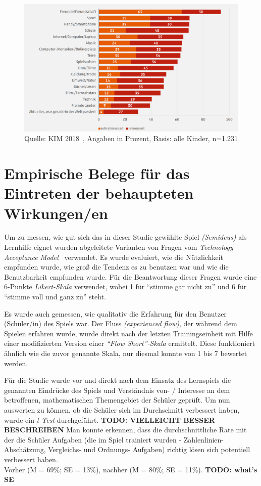 \documentclass[11pt, a4paper]{article}
\begin{document}
\begin{figure}[p]
    \centering
    \includegraphics[width=\textwidth]{img/kimstudie.png}
    \caption{Quelle: KIM 2018~\cite{feierabend2018kim}, Angaben in Prozent, Basis: alle Kinder, n=1.231}
    \label{fig:kim_studie}
\end{figure}

\newpage

\section*{Empirische Belege für das Eintreten der behaupteten Wirkungen/en}

Um zu messen, wie gut sich das in dieser Studie gewählte Spiel \textit{(Semideus)} als Lernhilfe eignet wurden abgeleitete Varianten von Fragen vom \textit{Technology Acceptance Model}~\cite{acceptance_of_Information_Technology_1989} verwendet. Es wurde evaluiert, wie die Nützlichkeit empfunden wurde, wie groß die Tendenz es zu benutzen war und wie die Benutzbarkeit empfunden wurde. Für die Beantwortung dieser Fragen wurde eine 6-Punkte \textit{Likert-Skala} verwendet, wobei 1 für ``stimme gar nicht zu'' und 6 für ``stimme voll und ganz zu'' steht.~\cite{Ninaus_Moeller_McMullen_Kiili_2017}

Es wurde auch gemessen, wie qualitativ die Erfahrung für den Benutzer (Schüler/in) des Spiels war. Der Fluss \textit{(experienced flow)}, der während dem Spielen erfahren wurde, wurde direkt nach der letzten Trainingseinheit mit Hilfe einer modifizierten Version einer \textit{``Flow Short''-Skala} ermittelt. Diese funktioniert ähnlich wie die zuvor genannte Skala, nur diesmal konnte von 1 bis 7 bewertet werden.~\cite{Ninaus_Moeller_McMullen_Kiili_2017}

Für die Studie wurde vor und direkt nach dem Einsatz des Lernspiels die genannten Eindrücke des Spiels und Verständnis von- / Interesse an dem betroffenen, mathematischen Themengebiet der Schüler geprüft. Um nun auswerten zu können, ob die Schüler sich im Durchschnitt verbessert haben, wurde ein \textit{t-Test} durchgeführt. \textbf{TODO: VIELLEICHT BESSER BESCHREIBEN} Man konnte erkennen, dass die durchschnittliche Rate mit der die Schüler Aufgaben (die im Spiel trainiert wurden - Zahlenlinien-Abschätzung, Vergleichs- und Ordnungs- Aufgaben) richtig lösen sich potentiell verbessert haben. \\ Vorher (M = 69\%; SE = 13\%), nachher (M = 80\%; SE = 11\%). \textbf{TODO: what's SE}
\end{document}
